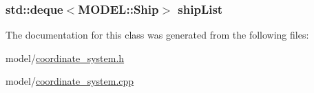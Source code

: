 \subsubsection[{\texorpdfstring{ship\+List}{shipList}}]{\setlength{\rightskip}{0pt plus 5cm}std\+::deque$<${\bf M\+O\+D\+E\+L\+::\+Ship}$>$ ship\+List\hspace{0.3cm}{\ttfamily [private]}}\hypertarget{classMODEL_1_1CoordinateSystem_ac3f25e91761f938fa2bdae218c7762d3}{}\label{classMODEL_1_1CoordinateSystem_ac3f25e91761f938fa2bdae218c7762d3}


The documentation for this class was generated from the following files\+:\begin{DoxyCompactItemize}
\item 
model/\hyperlink{coordinate__system_8h}{coordinate\+\_\+system.\+h}\item 
model/\hyperlink{coordinate__system_8cpp}{coordinate\+\_\+system.\+cpp}\end{DoxyCompactItemize}
